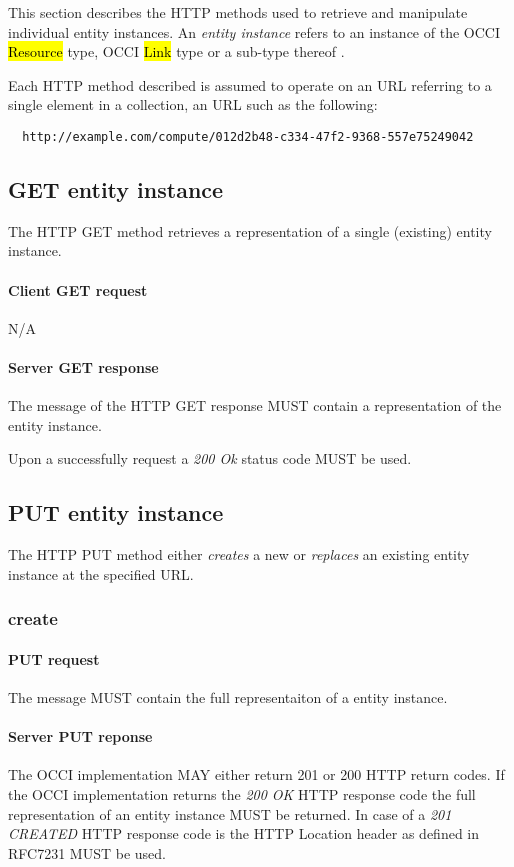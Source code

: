 \documentclass[10pt,a4paper]{article}
\begin{document}

This section describes the HTTP methods used to retrieve and manipulate
individual entity instances. An {\em entity instance} refers to an instance
of the OCCI \hl{Resource} type, OCCI \hl{Link} type or a sub-type thereof
\cite{occi:core}.

Each HTTP method described is assumed to operate
on an URL referring to a single element in a collection, an URL such as the
following:
\begin{verbatim}
  http://example.com/compute/012d2b48-c334-47f2-9368-557e75249042
\end{verbatim}

\subsection{GET entity instance}
The HTTP GET method retrieves a representation of a single (existing) entity instance.

\paragraph{Client GET request}
N/A

\paragraph{Server GET response}
The message of the HTTP GET response MUST contain a representation of the entity instance.

Upon a successfully request a \emph{200 Ok} status code MUST be used.

\subsection{PUT entity instance}
The HTTP PUT method either {\em creates} a new or {\em replaces} an existing entity instance at the specified URL.

\subsubsection{create}

\paragraph{PUT request}
The message MUST contain the full representaiton of a entity instance.

\paragraph{Server PUT reponse}
The OCCI implementation MAY either return 201 or 200 HTTP return codes. If the OCCI implementation
returns the \emph{200 OK} HTTP response code the full representation of an entity instance MUST be returned. 
In case of a \emph{201 CREATED} HTTP response code is the HTTP Location header as defined in RFC7231 \cite{rfc7231} MUST be used.
\end{document}
